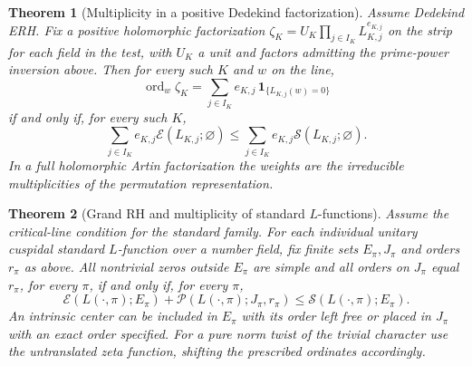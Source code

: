 \documentclass[11pt]{amsart}
\newtheorem{theorem}{Theorem}[section]
\theoremstyle{definition}
\theoremstyle{remark}
\numberwithin{equation}{section}
\begin{document}
\begin{theorem}[Multiplicity in a positive Dedekind factorization]
\label{thm:erh-factorwise-multiplicity}
Assume Dedekind ERH. Fix a positive holomorphic factorization
\(\zeta_K=U_K\prod_{j\in I_K}L_{K,j}^{e_{K,j}}\) on the strip for
each field in the test, with \(U_K\) a unit and factors admitting
the prime-power inversion above. Then for every such \(K\) and
\(w\) on the line,
\[
 \operatorname{ord}_w\zeta_K
  =\sum_{j\in I_K}e_{K,j}\,\mathbf1_{\{L_{K,j}(w)=0\}}
\]
if and only if, for every such \(K\),
\[
 \sum_{j\in I_K}e_{K,j}\mathcal E(L_{K,j};\varnothing)
 \le
 \sum_{j\in I_K}e_{K,j}\mathcal S(L_{K,j};\varnothing).
\]
In a full holomorphic Artin factorization the weights are the
irreducible multiplicities of the permutation representation.
\end{theorem}

\begin{theorem}[Grand RH and multiplicity of standard \(L\)-functions]
\label{thm:grand-multiplicity}
Assume the critical-line condition for the standard family. For each
individual unitary cuspidal standard \(L\)-function over a number
field, fix finite sets \(E_\pi,J_\pi\) and orders \(r_\pi\) as above.
All nontrivial zeros outside \(E_\pi\)
are simple and all orders on \(J_\pi\) equal \(r_\pi\), for every
\(\pi\), if and only if, for every \(\pi\),
\[
 \mathcal E(L(\cdot,\pi);E_\pi)
 +\mathcal P(L(\cdot,\pi);J_\pi,r_\pi)
 \le \mathcal S(L(\cdot,\pi);E_\pi).
\]
An intrinsic center can be included in \(E_\pi\) with its order
left free or placed in \(J_\pi\) with an exact order specified.
For a pure norm twist of the trivial character use the untranslated
zeta function, shifting the prescribed ordinates accordingly.
\end{theorem}
\end{document}
